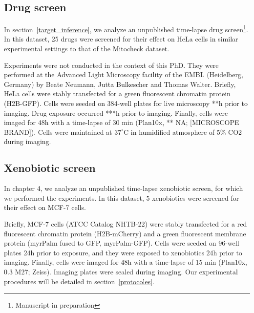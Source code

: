 \subsection{Drug screen}
In section~\ref{target_inference}, we analyze an unpublished time-lapse drug screen\footnote{Manuscript in preparation}. In this dataset, 25 drugs were screened for their effect on HeLa cells in similar experimental settings to that of the Mitocheck dataset.

Experiments were not conducted in the context of this PhD. They were performed at the Advanced Light Microscopy facility of the EMBL (Heidelberg, Germany) by Beate Neumann, Jutta Bulkescher and Thomas Walter. Briefly, HeLa cells were stably transfected for a green fluorescent chromatin protein (H2B-GFP). Cells were seeded on 384-well plates for live microscopy **h prior to imaging. Drug exposure occurred ***h prior to imaging. Finally, cells were imaged for 48h with a time-lapse of 30 min (Plan10x, ** NA; [MICROSCOPE BRAND]). Cells were maintained at $37^\circ$C in humidified atmosphere of 5\% CO2 during imaging.

\subsection{Xenobiotic screen}
In chapter 4, we analyze an unpublished time-lapse xenobiotic screen, for which we performed the experiments. In this dataset, 5 xenobiotics were screened for their effect on MCF-7 cells.

Briefly, MCF-7 cells (ATCC\up{\textregistered} Catalog NHTB-22\texttrademark) were stably transfected for a red fluorescent chromatin protein (H2B-mCherry) and a green fluorescent membrane protein (myrPalm fused to GFP, myrPalm-GFP). Cells were seeded on 96-well plates 24h prior to exposure, and they were exposed to xenobiotics 24h prior to imaging. Finally, cells were imaged for 48h with a time-lapse of 15 min (Plan10x, 0.3 M27; Zeiss). Imaging plates were sealed during imaging. Our experimental procedures will be detailed in section~\ref{protocoles}.

